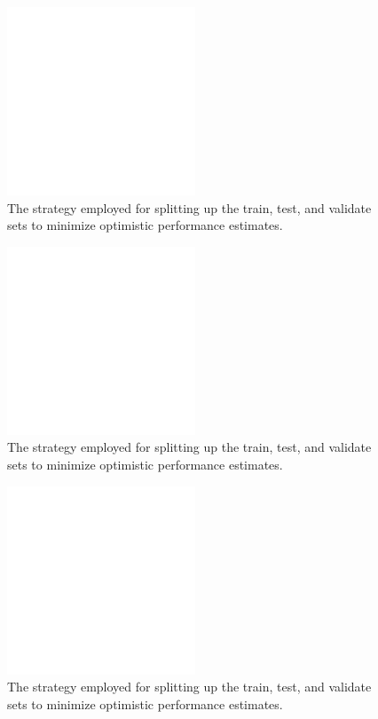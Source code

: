 \documentclass[twocolumn,draft]{article}
\begin{document}
\begin{figure}[!htbp]
\centering
\includegraphics[width=0.5\textwidth]{figures/placeholder}
\caption{The strategy employed for splitting up the train, test, and validate sets to minimize optimistic performance estimates.}
\label{tbl:block-shuffle}
\end{figure}

\begin{figure}[!htbp]
\centering
\includegraphics[width=0.5\textwidth]{figures/placeholder}
\caption{The strategy employed for splitting up the train, test, and validate sets to minimize optimistic performance estimates.}
\label{tbl:run-shuffle}
\end{figure}

\begin{figure}[!htbp]
\centering
\includegraphics[width=0.5\textwidth]{figures/placeholder}
\caption{The strategy employed for splitting up the train, test, and validate sets to minimize optimistic performance estimates.}
\label{tbl:session-shuffle}
\end{figure}
\end{document}
